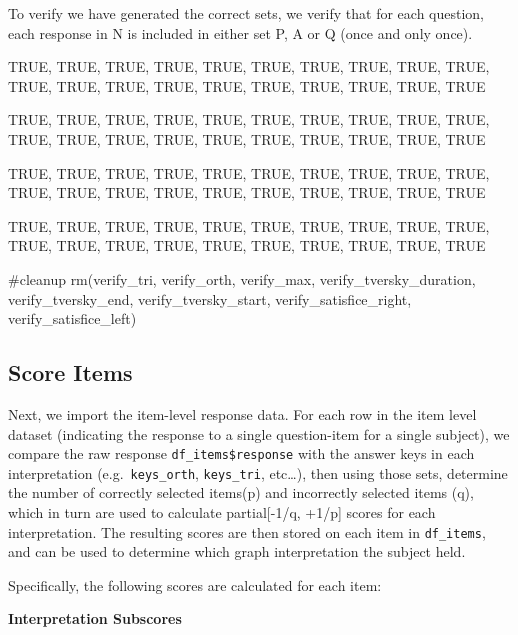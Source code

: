 \documentclass[
  letterpaper,
  DIV=11,
  numbers=noendperiod]{scrreprt}
\newenvironment{Shaded}{\begin{snugshade}}{\end{snugshade}}
\newcommand{\CommentTok}[1]{\textcolor[rgb]{0.37,0.37,0.37}{#1}}
\newcommand{\FunctionTok}[1]{\textcolor[rgb]{0.28,0.35,0.67}{#1}}
\newcommand{\NormalTok}[1]{\textcolor[rgb]{0.00,0.23,0.31}{#1}}
\begin{document}
To verify we have generated the correct sets, we verify that for each
question, each response in N is included in either set P, A or Q (once
and only once).

TRUE, TRUE, TRUE, TRUE, TRUE, TRUE, TRUE, TRUE, TRUE, TRUE, TRUE, TRUE,
TRUE, TRUE, TRUE, TRUE, TRUE, TRUE, TRUE, TRUE

TRUE, TRUE, TRUE, TRUE, TRUE, TRUE, TRUE, TRUE, TRUE, TRUE, TRUE, TRUE,
TRUE, TRUE, TRUE, TRUE, TRUE, TRUE, TRUE, TRUE

TRUE, TRUE, TRUE, TRUE, TRUE, TRUE, TRUE, TRUE, TRUE, TRUE, TRUE, TRUE,
TRUE, TRUE, TRUE, TRUE, TRUE, TRUE, TRUE, TRUE

TRUE, TRUE, TRUE, TRUE, TRUE, TRUE, TRUE, TRUE, TRUE, TRUE, TRUE, TRUE,
TRUE, TRUE, TRUE, TRUE, TRUE, TRUE, TRUE, TRUE

\begin{Shaded}
\begin{Highlighting}[]
\CommentTok{\#cleanup}
\FunctionTok{rm}\NormalTok{(verify\_tri, verify\_orth, verify\_max, verify\_tversky\_duration, verify\_tversky\_end, verify\_tversky\_start, verify\_satisfice\_right, verify\_satisfice\_left)}
\end{Highlighting}
\end{Shaded}

\hypertarget{score-items}{%
\subsection{Score Items}\label{score-items}}

Next, we import the item-level response data. For each row in the item
level dataset (indicating the response to a single question-item for a
single subject), we compare the raw response
\texttt{df\_items\$response} with the answer keys in each interpretation
(e.g.~\texttt{keys\_orth}, \texttt{keys\_tri}, etc\ldots), then using
those sets, determine the number of correctly selected items(p) and
incorrectly selected items (q), which in turn are used to calculate
partial{[}-1/q, +1/p{]} scores for each interpretation. The resulting
scores are then stored on each item in \texttt{df\_items}, and can be
used to determine which graph interpretation the subject held.

Specifically, the following scores are calculated for each item:

\textbf{Interpretation Subscores}
\end{document}
